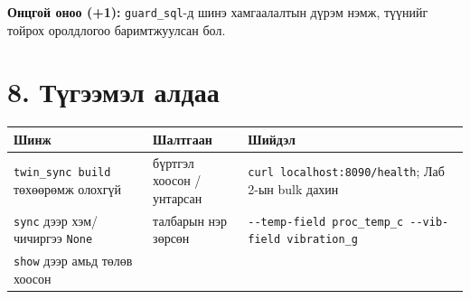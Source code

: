\textbf{Онцгой оноо (+1):} \texttt{guard\_sql}-д шинэ хамгаалалтын дүрэм нэмж, түүнийг тойрох оролдлогоо баримтжуулсан бол.

\hypertarget{ux442ux4afux433ux44dux44dux43cux44dux43b-ux430ux43bux434ux430ux430}{%
\section{8. Түгээмэл алдаа}\label{ux442ux4afux433ux44dux44dux43cux44dux43b-ux430ux43bux434ux430ux430}}

\begingroup\scriptsize\begin{longtable}[]{@{}lll@{}}
\toprule
\begin{minipage}[b]{0.30\columnwidth}\raggedright
Шинж\strut
\end{minipage} & \begin{minipage}[b]{0.30\columnwidth}\raggedright
Шалтгаан\strut
\end{minipage} & \begin{minipage}[b]{0.30\columnwidth}\raggedright
Шийдэл\strut
\end{minipage}\tabularnewline
\midrule
\endhead
\begin{minipage}[t]{0.30\columnwidth}\raggedright
\texttt{twin\_\allowbreak{}sync\ build} төхөөрөмж олохгүй\strut
\end{minipage} & \begin{minipage}[t]{0.30\columnwidth}\raggedright
бүртгэл хоосон / унтарсан\strut
\end{minipage} & \begin{minipage}[t]{0.30\columnwidth}\raggedright
\texttt{curl\ localhost:\allowbreak{}8090/\allowbreak{}health}; Лаб 2-ын bulk дахин\strut
\end{minipage}\tabularnewline
\begin{minipage}[t]{0.30\columnwidth}\raggedright
\texttt{sync} дээр хэм/чичиргээ \texttt{None}\strut
\end{minipage} & \begin{minipage}[t]{0.30\columnwidth}\raggedright
талбарын нэр зөрсөн\strut
\end{minipage} & \begin{minipage}[t]{0.30\columnwidth}\raggedright
\texttt{-\/\allowbreak{}-temp-field\ proc\_\allowbreak{}temp\_\allowbreak{}c\ -\/\allowbreak{}-vib-field\ vibration\_\allowbreak{}g}\strut
\end{minipage}\tabularnewline
\begin{minipage}[t]{0.30\columnwidth}\raggedright
\texttt{show} дээр амьд төлөв хоосон\strut

\end{minipage}
\end{longtable}
